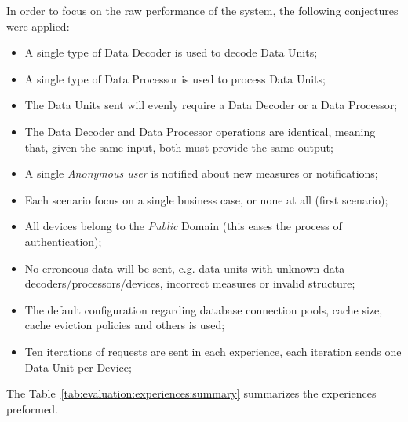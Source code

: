 In order to focus on the raw performance of the system, the following conjectures were applied:

\begin{itemize}
    \item A single type of Data Decoder is used to decode Data Units;
    \item A single type of Data Processor is used to process Data Units;
    \item The Data Units sent will evenly require a Data Decoder or a Data Processor;
    \item The Data Decoder and Data Processor operations are identical, meaning that, given the same input, both must provide the same output;
    \item A single \textit{Anonymous user} is notified about new measures or notifications;
    \item Each scenario focus on a single business case, or none at all (first scenario);
    \item All devices belong to the \textit{Public} Domain (this eases the process of authentication);
    \item No erroneous data will be sent, e.g. data units with unknown data decoders/processors/devices, incorrect measures or invalid structure;
    \item The default configuration regarding database connection pools, cache size, cache eviction policies and others is used;
    \item Ten iterations of requests are sent in each experience, each iteration sends one Data Unit per Device;
\end{itemize}

The Table~\ref{tab:evaluation:experiences:summary} summarizes the experiences preformed.

